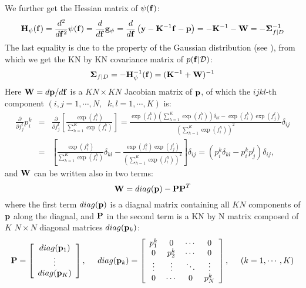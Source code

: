 \documentclass{article}
\begin{document}
We further get the Hessian matrix of $\psi({\bf f})$:
\begin{equation}
  {\bf H}_\psi({\bf f})=\frac{d^2}{d{\bf f}^2} \psi({\bf f})
  =\frac{d}{d{\bf f}} {\bf g}_\psi
  =\frac{d}{d{\bf f}}\left( {\bf y}-{\bf K}^{-1}{\bf f}-{\bf p} \right)
  =-{\bf K}^{-1} -{\bf W}=-{\bf\Sigma}_{f|D}^{-1}
\end{equation}
The last equality is due to the property of the Gaussian distribution
(see ), from
which we get the KN by KN covariance matrix of $p({\bf f}|{\cal D})$:
\begin{equation}
  {\bf\Sigma}_{f|D}=-{\bf H}^{-1}_\psi({\bf f})=({\bf K}^{-1}+{\bf W})^{-1}
  \label{SigmaF}
\end{equation}
Here ${\bf W}=d{\bf p}/d{\bf f}$ is a $KN\times KN$ Jacobian matrix
of ${\bf p}$, of which the $ijkl$-th component 
$(i,j=1,\cdots,N,\;\;k,l=1,\cdots,K)$ is:
\begin{eqnarray}
  \frac{\partial}{\partial f_j^l} p_i^k
  &=&\frac{\partial}{\partial f_j^l}\left[\frac{\exp(f_i^k)}{\sum_{h=1}^K\exp(f_i^h)}\right]
  =\frac{\exp(f_i^k)\left(\sum_{h=1}^K\exp(f_i^h)\right)\delta_{kl}
    -\exp(f_i^k)\exp(f_j^l)}{\left(\sum_{h=1}^K\exp(f_i^h)\right)^2}\delta_{ij}
  \nonumber\\
  &=&\left[\frac{\exp(f_i^k)}{\sum_{h=1}^K\exp(f_i^h)}\delta_{kl}
    -\frac{\exp(f_i^k)\exp(f_j^l)}{\left(\sum_{h=1}^K\exp(f_i^h)\right)^2}\right]
  \delta_{ij}
  =(p_i^k\delta_{kl}-p_i^k p_j^l)\delta_{ij},
\end{eqnarray}
and ${\bf W}$ can be written also in two terms:
\begin{equation}
  {\bf W}=diag({\bf p})-{\bf PP}^T
  \label{WWW}
\end{equation}
where the first term $diag({\bf p})$ is a diagnal matrix containing 
all $KN$ components of ${\bf p}$ along the diagnal, and ${\bf P}$ 
in the second term is a KN by N matrix composed of $K$ $N\times N$ 
diagonal matrices $diag({\bf p}_k)$:
\begin{equation}
  {\bf P}=\left[\begin{array}{c}diag({\bf p}_1)\\
      \vdots\\ diag({\bf p}_K)\end{array}\right],\;\;\;\;\;
  diag({\bf p}_k)=\left[\begin{array}{cccc}p_1^k & 0 & \cdots & 0\\
      0 & p_2^k & \cdots & 0\\\vdots & \vdots & \ddots & \vdots\\
      0 & \cdots & 0 & p_N^k
    \end{array}\right],\;\;\;\;\;(k=1,\cdots,K)
\end{equation}
\end{document}
